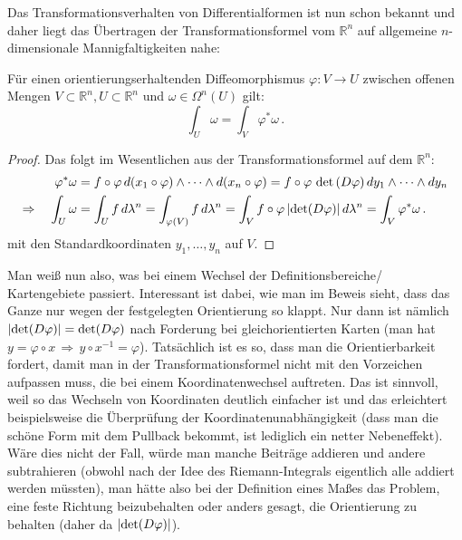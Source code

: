 \documentclass[../H_Analysis_main.tex]{subfiles}
\begin{document}
Das Transformationsverhalten von Differentialformen ist nun schon bekannt und daher liegt das Übertragen der Transformationsformel vom $\mathbb{R}^n$ auf allgemeine $n$-dimensionale Mannigfaltigkeiten nahe:
\begin{satz}[Transformationsformel]
Für einen orientierungserhaltenden Diffeomorphismus $\varphi: V \rightarrow U$ zwischen offenen Mengen $V \subset \mathbb{R}^n, U \subset \mathbb{R}^n$ und $\omega \in \Omega^n(U)$ gilt:
\begin{equation}
\int_U \omega = \int_V \varphi^* \omega \, .
\end{equation}
\end{satz}
\begin{proof}
Das folgt im Wesentlichen aus der Transformationsformel auf dem $\mathbb{R}^n$:
\begin{align*}
\varphi^* \omega &= f \circ \varphi \, d\qty(x_1 \circ \varphi) \wedge \dots \wedge d\qty(x_n \circ \varphi) = f \circ \varphi \, \det\qty(D\varphi) \, dy_1 \wedge \dots \wedge dy_n
\\
\Rightarrow \quad \int_ U \omega &= \int_U f \, d\lambda^n = \int_{\varphi(V)} f \, d\lambda^n = \int_V f \circ \varphi \, \abs{\det(D\varphi)} \, d\lambda^n = \int_V \varphi^* \omega \, .
\end{align*}
mit den Standardkoordinaten $y_1, \dots, y_n$ auf $V$.
\end{proof}

Man weiß nun also, was bei einem Wechsel der Definitionsbereiche/ Kartengebiete passiert. Interessant ist dabei, wie man im Beweis sieht, dass das Ganze nur wegen der festgelegten Orientierung so klappt. Nur dann ist nämlich $\abs{\det(D\varphi)} = \det(D\varphi)$ nach Forderung bei gleichorientierten Karten (man hat $y = \varphi \circ x \, \Rightarrow \, y \circ x^{-1} = \varphi$). Tatsächlich ist es so, dass man die Orientierbarkeit fordert, damit man in der Transformationsformel nicht mit den Vorzeichen aufpassen muss, die bei einem Koordinatenwechsel auftreten. Das ist sinnvoll, weil so das Wechseln von Koordinaten deutlich einfacher ist und das erleichtert beispielsweise die Überprüfung der Koordinatenunabhängigkeit (dass man die schöne Form mit dem Pullback bekommt, ist lediglich ein netter Nebeneffekt). Wäre dies nicht der Fall, würde man manche Beiträge addieren und andere subtrahieren (obwohl nach der Idee des Riemann-Integrals eigentlich alle addiert werden müssten), man hätte also bei der Definition eines Maßes das Problem, eine feste Richtung beizubehalten oder anders gesagt, die Orientierung zu behalten (daher da $\abs{\det(D\varphi)}$).
\end{document}
